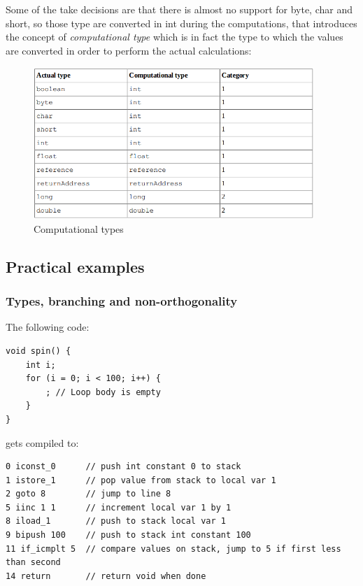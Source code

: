 Some of the take decisions are that there is almost no support for byte, char and short, so those type are converted in int during the computations, that introduces the concept of \emph{computational type} which is in fact the type to which the values are converted in order to perform the actual calculations:
\begin{figure}[H]
    \centering
    \includegraphics[width=400px]{images/2_JVM/computational_types.png}
    \caption{Computational types}
\end{figure}

\subsection{Practical examples}

\subsubsection{Types, branching and non-orthogonality}
The following code:
\begin{verbatim}
void spin() {
    int i;
    for (i = 0; i < 100; i++) {
        ; // Loop body is empty
    }
} 
\end{verbatim}
gets compiled to:
\begin{verbatim}
0 iconst_0      // push int constant 0 to stack
1 istore_1      // pop value from stack to local var 1
2 goto 8        // jump to line 8
5 iinc 1 1      // increment local var 1 by 1
8 iload_1       // push to stack local var 1
9 bipush 100    // push to stack int constant 100
11 if_icmplt 5  // compare values on stack, jump to 5 if first less than second
14 return       // return void when done
\end{verbatim}

